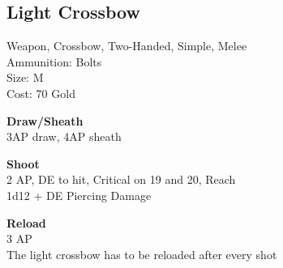 \subsection{Light Crossbow}\label{weapon:lightCrossbow}
Weapon, Crossbow, Two-Handed, Simple, Melee\\
Ammunition: Bolts\\
Size: M\\
Cost: 70 Gold

\textbf{Draw/Sheath} \\
3AP draw, 4AP sheath

\textbf{Shoot} \\
2 AP, DE to hit, Critical on 19 and 20,  Reach\\
1d12 + \texttimes DE Piercing Damage

\textbf{Reload} \\
3 AP\\
The light crossbow has to be reloaded after every shot

